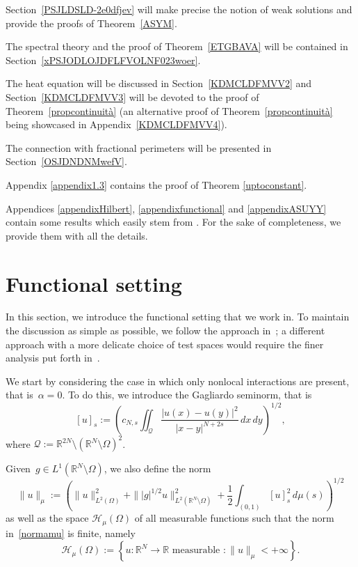 \documentclass[12pt,a4paper,intlimits,sumlimits]{amsart}
\def \R {\mathbb{R}}
\def \Q {\mathcal Q}
\theoremstyle{definition}
\theoremstyle{plain}
\numberwithin{equation}{section}
\begin{document}
Section~\ref{PSJLDSLD-2e0dfjev} will make precise the notion of weak solutions and provide the proofs of Theorem~\ref{ASYM}.

The spectral theory and the proof of Theorem~\ref{ETGBAVA} will be contained in Section~\ref{xPSJODLOJDFLFVOLNF023woer}.

The heat equation will be discussed in Section~\ref{KDMCLDFMVV2}
and Section~\ref{KDMCLDFMVV3} will be devoted to the
proof of Theorem~\ref{propcontinuità} (an alternative proof of
Theorem~\ref{propcontinuità} being showcased in Appendix~\ref{KDMCLDFMVV4}).

The connection with fractional perimeters will be presented in Section~\ref{OSJDNDNMwefV}.

Appendix \ref{appendix1.3} contains the proof of Theorem \ref{uptoconstant}. 

Appendices \ref{appendixHilbert}, \ref{appendixfunctional} and \ref{appendixASUYY} contain some results which easily stem from \cite[Proposition 3.1, Proposition 3.7, Proposition 4.3]{MR3651008}. For the sake of completeness, we provide them with all the details.

\section{Functional setting}\label{KDMCLDFMVV}

In this section, we introduce the functional setting that we work in. 
To maintain the discussion as simple as possible, we follow the approach in~\cite{MR3651008};
a different approach with a more delicate choice of test spaces would require the finer analysis put forth in~\cite{MR4683738}.

We start by considering the case in which only nonlocal interactions are present,
that is~$\alpha=0$.
To do this, we introduce the Gagliardo seminorm, that is 
\begin{equation}\label{defsemipi659uir}
[u]_s:= \left({c_{N, s}}\iint_{\mathcal Q} \frac{|u(x)-u(y)|^2}{|x-y|^{N+2s}} \, dx\,dy\right)^{1/2},
\end{equation}
where $\Q:=\R^{2N}\setminus (\R^N\setminus \Omega)^2$.

Given~$g\in L^1(\R^N\setminus\Omega)$, we also define the norm
\begin{equation}\label{normamu}
\|u\|_\mu := \left(\|u\|^2_{L^2(\Omega)} + \| |g|^{1/2} u\|^2_{L^2(\R^N\setminus\Omega)} +\frac12\int_{(0, 1)} [u]_s^2 \, d\mu(s) \right)^{1/2}
\end{equation}
as well as the space $\mathcal H_\mu (\Omega)$ of all measurable functions such that the norm in~\eqref{normamu} is finite, namely
\begin{equation}\label{Hmu}
\mathcal H_\mu (\Omega):= \left\lbrace u:\R^N\to\R \text{ measurable } : \|u\|_\mu <+\infty \right\rbrace.
\end{equation}
\end{document}
